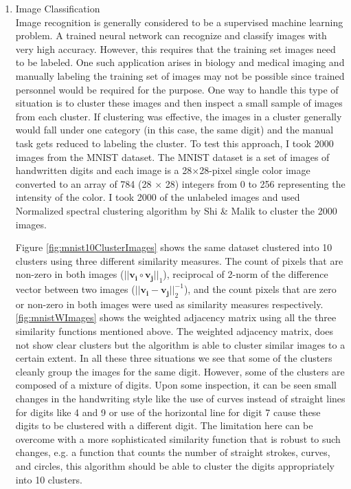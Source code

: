 \documentclass[10pt,a4paper, nocenter]{report}
\begin{document}
\begin{enumerate}
        \item{Image Classification}\\
        Image recognition is generally considered to be a supervised machine learning problem. A trained neural network can recognize and classify images with very high accuracy. However, this requires that the training set images need to be labeled. One such application arises in biology and medical imaging and manually labeling the training set of images may not be possible since trained personnel would be required for the purpose. One way to handle this type of situation is to cluster these images and then inspect a small sample of images from each cluster. If clustering was effective, the images in a cluster generally would fall under one category (in this case, the same digit) and the manual task gets reduced to labeling the cluster. To test this approach, I took 2000 images from the MNIST dataset. The MNIST dataset is a set of images of handwritten digits and each image is a 28$\times$28-pixel single color image converted to an array of 784 (28 $\times$ 28) integers from 0 to 256 representing the intensity of the color. I took 2000 of the unlabeled images and used Normalized spectral clustering algorithm by Shi \& Malik \cite{Shi-Malik-maxcut-00} to cluster the 2000 images.
        
        Figure \ref{fig:mnist10ClusterImages} shows the same dataset clustered into 10 clusters using three different similarity measures. The count of pixels that are non-zero in both images ($\lvert \lvert \mathbf{v_i} \circ \mathbf{v_j} \rvert \rvert_1$), reciprocal of 2-norm of the difference vector between two images ($\lvert \lvert \mathbf{v_i} - \mathbf{v_j} \rvert \rvert_2^{-1}$), and the count pixels that are zero or non-zero in both images were used as similarity measures respectively. \ref{fig:mnistWImages} shows the weighted adjacency matrix using all the three similarity functions mentioned above. The weighted adjacency matrix, does not show clear clusters but the algorithm is able to cluster similar images to a certain extent. In all these three situations we see that some of the clusters cleanly group the images for the same digit. However, some of the  clusters are composed of a mixture of digits. Upon some inspection, it can be seen small changes in the handwriting style like the use of curves instead of straight lines for digits like 4 and 9 or use of the horizontal line for digit 7 cause these digits to be clustered with a different digit. The limitation here can be overcome with a more sophisticated similarity function that is robust to such changes, e.g. a function that counts the number of straight strokes, curves, and circles, this algorithm should be able to cluster the digits appropriately into 10 clusters.


\end{enumerate}
\end{document}
